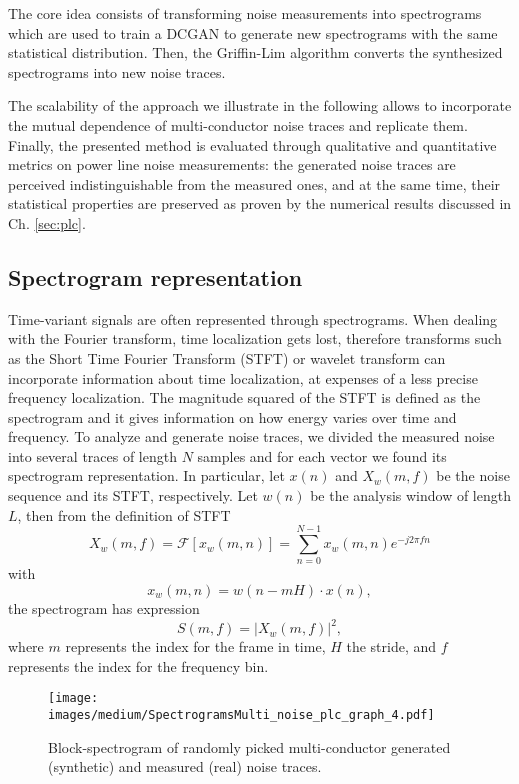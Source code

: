The core idea consists of transforming noise measurements into spectrograms which are used to train a DCGAN to generate new spectrograms with the same statistical distribution. Then, the Griffin-Lim algorithm \cite{GriffinLim} converts the synthesized spectrograms into new noise traces.

The scalability of the approach we illustrate in the following allows to incorporate the mutual dependence of multi-conductor noise traces and replicate them.
Finally, the presented method is evaluated through qualitative and quantitative metrics on power line noise measurements: the generated noise traces are perceived indistinguishable from the measured ones, and at the same time, their statistical properties are preserved as proven by the numerical results discussed in Ch. \ref{sec:plc}. 

\subsection{Spectrogram representation}
Time-variant signals are often represented through spectrograms. When dealing with the Fourier transform, time localization gets lost, therefore transforms such as the Short Time Fourier Transform (STFT) or wavelet transform can incorporate information about time localization, at expenses of a less precise frequency localization. The magnitude squared of the STFT is defined as the spectrogram and it gives information on how energy varies over time and frequency.
To analyze and generate noise traces, we divided the measured noise into several traces of length $N$ samples and for each vector we found its spectrogram representation. In particular, let $x(n)$ and $X_w(m,f)$ be the noise sequence and its STFT, respectively. Let $w(n)$ be the analysis window of length $L$, then from the definition of STFT
\begin{equation}
X_w(m,f)=\mathcal{F}[x_w(m,n)]=\sum_{n=0}^{N-1}{x_w(m,n)e^{-j2\pi f n}}
\end{equation}
with
\begin{equation}
x_w(m,n) = w(n-mH)\cdot x(n),
\end{equation}
the spectrogram has expression
\begin{equation}
S(m,f) = |X_w(m,f)|^2,
\end{equation}
where $m$ represents the index for the frame in time, $H$ the stride, and $f$ represents the index for the frequency bin. 

\begin{figure}
	\centering
	\texttt{[image: images/medium/SpectrogramsMulti\_noise\_plc\_graph\_4.pdf]}
	\caption{Block-spectrogram of randomly picked  multi-conductor generated (synthetic) and measured (real) noise traces.}
	\label{fig:medium_Block-Spectrogram}
\end{figure}


